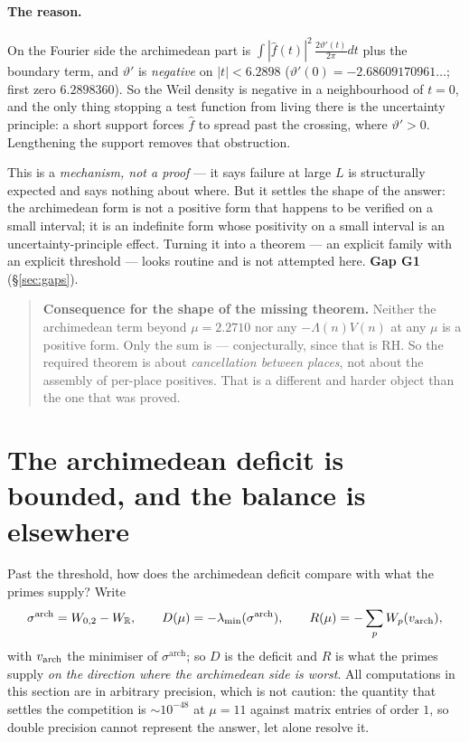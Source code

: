 \documentclass[11pt,a4paper]{article}
\theoremstyle{plain}
\theoremstyle{definition}
\theoremstyle{remark}
\newcommand{\R}{\mathbb{R}}
\begin{document}
\paragraph{The reason.}  On the Fourier side the archimedean part is
$\int|\widehat f(t)|^2\,\frac{2\vartheta'(t)}{2\pi}dt$ plus the boundary term,
and $\vartheta'$ is \emph{negative} on $|t|<6.2898$
($\vartheta'(0)=-2.68609170961\ldots$; first zero $6.2898360$).  So the Weil
density is negative in a neighbourhood of $t=0$, and the only thing stopping a
test function from living there is the uncertainty principle: a short support
forces $\widehat f$ to spread past the crossing, where $\vartheta'>0$.
Lengthening the support removes that obstruction.

This is a \emph{mechanism, not a proof} --- it says failure at large $L$ is
structurally expected and says nothing about where.  But it settles the shape of
the answer: the archimedean form is not a positive form that happens to be
verified on a small interval; it is an indefinite form whose positivity on a
small interval is an uncertainty-principle effect.  Turning it into a theorem ---
an explicit family with an explicit threshold --- looks routine and is not
attempted here.  \textbf{Gap G1} (\S\ref{sec:gaps}).

\begin{quote}
\textbf{Consequence for the shape of the missing theorem.}  Neither the
archimedean term beyond $\mu=2.2710$ nor any $-\Lambda(n)V(n)$ at any $\mu$ is a
positive form.  Only the sum is --- conjecturally, since that is RH.  So the
required theorem is about \emph{cancellation between places}, not about the
assembly of per-place positives.  That is a different and harder object than the
one that was proved.
\end{quote}

\section{The archimedean deficit is bounded, and the balance is elsewhere}
\label{sec:deficit}

Past the threshold, how does the archimedean deficit compare with what the
primes supply?  Write
\[
  \sigma^{\mathrm{arch}}=W_{0,2}-W_\R,\qquad
  D(\mu)=-\lambda_{\min}(\sigma^{\mathrm{arch}}),\qquad
  R(\mu)=-\sum_pW_p(v_{\rm arch}),
\]
with $v_{\rm arch}$ the minimiser of $\sigma^{\mathrm{arch}}$; so $D$ is the
deficit and $R$ is what the primes supply \emph{on the direction where the
archimedean side is worst}.  All computations in this section are in arbitrary
precision, which is not caution: the quantity that settles the competition is
$\sim10^{-48}$ at $\mu=11$ against matrix entries of order $1$, so double
precision cannot represent the answer, let alone resolve it.
\end{document}
